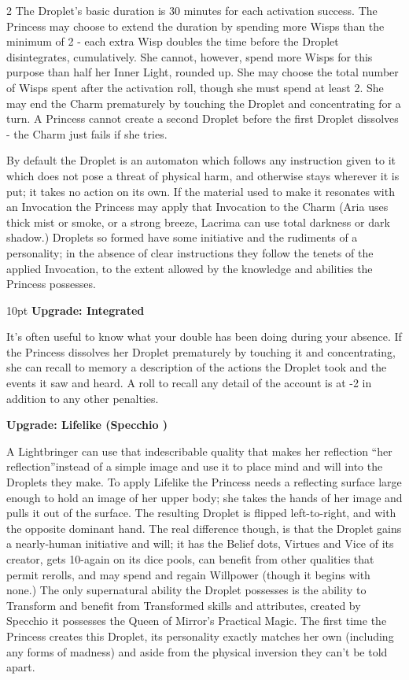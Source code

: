 \begin{multicols}{2}
The Droplet's basic duration is 30 minutes for each activation success. The Princess may choose to extend the duration by spending more Wisps than the minimum of 2 - each extra Wisp doubles the time before the Droplet disintegrates, cumulatively. She cannot, however, spend more Wisps for this purpose than half her Inner Light, rounded up. She may choose the total number of Wisps spent after the activation roll, though she must spend at least 2. She may end the Charm prematurely by touching the Droplet and concentrating for a turn. A Princess cannot create a second Droplet before the first Droplet dissolves - the Charm just fails if she tries.

By default the Droplet is an automaton which follows any instruction given to it which does not pose a threat of physical harm, and otherwise stays wherever it is put; it takes no action on its own. If the material used to make it resonates with an Invocation the Princess may apply that Invocation to the Charm (Aria uses thick mist or smoke, or a strong breeze, Lacrima can use total darkness or dark shadow.) Droplets so formed have some initiative and the rudiments of a personality; in the absence of clear instructions they follow the tenets of the applied Invocation, to the extent allowed by the knowledge and abilities the Princess possesses.

\begin{myindentpar}{10pt} \textbf{Upgrade: Integrated}

It's often useful to know what your double has been doing during your absence. If the Princess dissolves her Droplet prematurely by touching it and concentrating, she can recall to memory a description of the actions the Droplet took and the events it saw and heard. A roll to recall any detail of the account is at -2 in addition to any other penalties.

\textbf{Upgrade: Lifelike (Specchio \textbullet\textbullet\textbullet)}

A Lightbringer can use that indescribable quality that makes her reflection \textquotedblleft her reflection\textquotedblright instead of a simple image and use it to place mind and will into the Droplets they make. To apply Lifelike the Princess needs a reflecting surface large enough to hold an image of her upper body; she takes the hands of her image and pulls it out of the surface. The resulting Droplet is flipped left-to-right, and with the opposite dominant hand. The real difference though, is that the Droplet gains a nearly-human initiative and will; it has the Belief dots, Virtues and Vice of its creator, gets 10-again on its dice pools, can benefit from other qualities that permit rerolls, and may spend and regain Willpower (though it begins with none.) The only supernatural ability the Droplet possesses is the ability to Transform and benefit from Transformed skills and attributes, created by Specchio it possesses the Queen of Mirror's Practical Magic. The first time the Princess creates this 
Droplet, its personality exactly matches her own (including any forms of madness) and aside from the physical inversion they can't be told apart.


\end{myindentpar}
\end{multicols}
